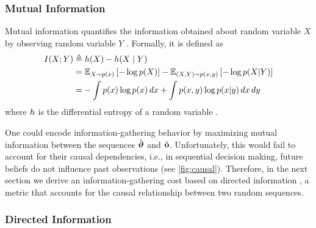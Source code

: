 \subsubsection{Mutual Information}
Mutual information quantifies the information obtained about  random variable $X$ by observing random variable $Y$ \cite[Def. 8.9.1]{cover1999elements}.
Formally, it is defined as
\begin{subequations}
    \begin{align}
        I(X;Y) &\triangleq h(X) - h(X\mid Y)\\
        &= \mathbb{E}_{X\sim p(x)}\left[-\log p(X)\right] - \mathbb{E}_{(X,Y)\sim p(x,y)}\left[-\log p(X|Y)\right] \\
        &= -\int p(x)\log p(x)\,dx + \int p(x,y)\log p(x|y)\,dx\,dy
        \label{eq:mutual_information}
    \end{align}
\end{subequations}
where $h$ is the differential entropy of a random variable \cite[Def. 8.1]{cover1999elements}.

One could encode information-gathering behavior by maximizing mutual information between the sequences $\hat{\boldsymbol{{\vartheta}}}$ and $\hat{\mathbf{o}}$. 
Unfortunately, this would fail to account for their causal dependencies, i.e., in sequential decision making, future beliefs do not influence past observations (see \cref{fig:causal}). 
Therefore, in the next section we derive an information-gathering cost based on directed information \cite{massey1990causality}, a metric that accounts for the causal relationship between two random sequences.

\subsubsection{Directed Information}


